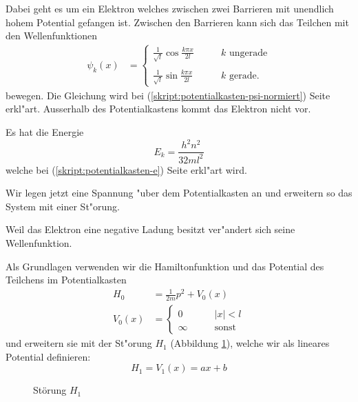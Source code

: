 \begin{refsection}
Dabei geht es um ein Elektron welches zwischen zwei Barrieren mit unendlich hohem Potential gefangen ist.
Zwischen den Barrieren kann sich das Teilchen mit den Wellenfunktionen
\begin{align}
\psi_k(x)
&=
\begin{cases}
\displaystyle
\frac{1}{\sqrt{l}}\cos\frac{k \pi x}{2l}&\qquad \text{$k$ ungerade}\\
\\
\displaystyle
\frac{1}{\sqrt{l}}\sin\frac{k \pi x}{2l}&\qquad \text{$k$ gerade}.
\end{cases}
\end{align}
bewegen.
Die Gleichung wird bei (\ref{skript:potentialkasten-psi-normiert}) Seite \pageref{skript:potentialkasten-psi-normiert} erkl"art.
Ausserhalb des Potentialkastens kommt das Elektron nicht vor.

Es hat die Energie
\[
E_k = \frac{h^2n^2}{32ml^2}
\]
welche bei (\ref{skript:potentialkasten-e})
Seite \pageref{skript:potentialkasten-e} erkl"art wird.

Wir legen jetzt eine Spannung "uber dem Potentialkasten an
und erweitern so das System mit einer St"orung.

Weil das Elektron eine negative Ladung besitzt ver"andert sich seine Wellenfunktion.

Als Grundlagen verwenden wir die Hamiltonfunktion und das Potential des Teilchens im Potentialkasten
\begin{equation}
\begin{aligned}
H_0&=\frac1{2m}p^2+V_0(x)
\\
V_0(x)&=
  \begin{cases}
    0       & \qquad |x|<l\\
    \infty  & \qquad\text{sonst}
  \end{cases}
\end{aligned}
\end{equation}
und erweitern sie mit der St"orung $H_1$ (Abbildung \ref{abb:efeld_H_1}), welche wir als lineares 
Potential definieren:
\begin{equation}
  H_1 = V_1(x) = a x + b
\end{equation}

\begin{figure}
  \centering
{}
 \caption{St\"orung $H_1$}
 \label{abb:efeld_H_1}
\end{figure}


\end{refsection}
